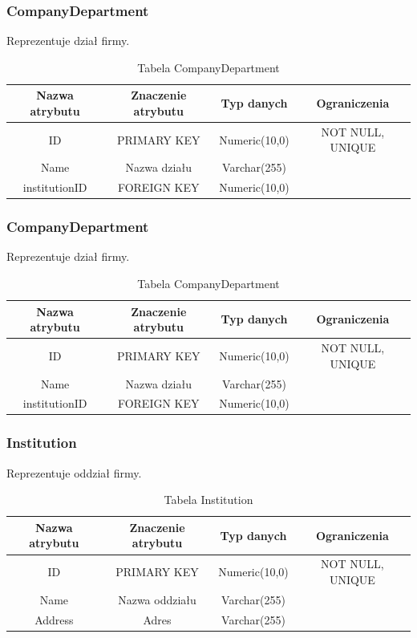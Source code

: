 \subsubsection{CompanyDepartment}
Reprezentuje dział firmy.
\begin{table}[H]
	\renewcommand\arraystretch{1.5}
	\renewcommand\tabcolsep{3pt}
	\begin{tabular}{| c | c | c | c |} 
		\hline \textbf{Nazwa atrybutu} & \textbf{Znaczenie atrybutu} & \textbf{Typ danych} & \textbf{Ograniczenia} \\ 
		\hline ID & PRIMARY KEY & Numeric(10,0) & NOT NULL, UNIQUE \\ 
		\hline Name & Nazwa działu & Varchar(255) &  \\ 
		\hline institutionID & FOREIGN KEY & Numeric(10,0) & \\ 
		\hline 
	\end{tabular} 
	\caption{Tabela CompanyDepartment}
	\label{TAB:CompanyDepartment}
\end{table}

\subsubsection{CompanyDepartment}
Reprezentuje dział firmy.
\begin{table}[H]
	\renewcommand\arraystretch{1.5}
	\renewcommand\tabcolsep{3pt}
	\begin{tabular}{| c | c | c | c |} 
		\hline \textbf{Nazwa atrybutu} & \textbf{Znaczenie atrybutu} & \textbf{Typ danych} & \textbf{Ograniczenia} \\ 
		\hline ID & PRIMARY KEY & Numeric(10,0) & NOT NULL, UNIQUE \\ 
		\hline Name & Nazwa działu & Varchar(255) &  \\ 
		\hline institutionID & FOREIGN KEY & Numeric(10,0) & \\ 
		\hline 
	\end{tabular} 
	\caption{Tabela CompanyDepartment}
	\label{TAB:CompanyDepartment}
\end{table}

\subsubsection{Institution}
Reprezentuje oddział firmy.
\begin{table}[H]
	\renewcommand\arraystretch{1.5}
	\renewcommand\tabcolsep{3pt}
	\begin{tabular}{| c | c | c | c |} 
		\hline \textbf{Nazwa atrybutu} & \textbf{Znaczenie atrybutu} & \textbf{Typ danych} & \textbf{Ograniczenia} \\ 
		\hline ID & PRIMARY KEY & Numeric(10,0) & NOT NULL, UNIQUE \\ 
		\hline Name & Nazwa oddziału & Varchar(255) &  \\ 
		\hline Address & Adres & Varchar(255) & \\ 
		\hline 
	\end{tabular} 
	\caption{Tabela Institution}
	\label{TAB:Institution}
\end{table}

